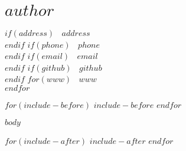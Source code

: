\documentclass[$if(fontsize)$$fontsize$,$endif$$if(lang)$$lang$,$endif$$if(papersize)$$papersize$,$endif$$for(classoption)$$classoption$$sep$,$endfor$]{$documentclass$}
\begin{document}
\section{$author$}\label{author}

$if(address)$
\faMap \(~\) $address$\\
$endif$
$if(phone)$
\faPhone \(~\) $phone$\\
$endif$
$if(email)$
\faEnvelope \(~\) $email$\\
$endif$
$if(github)$
\faGithub \(~\) $github$\\
$endif$
$for(www)$
\faGlobe \(~\) $www$\\
$endfor$





$for(include-before)$
$include-before$
$endfor$

$body$

$for(include-after)$
$include-after$
$endfor$
\end{document}
